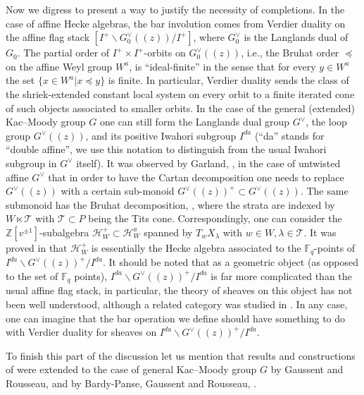 \documentclass{amsart}
\newcommand{\Z}{\mathbb{Z}}
\theoremstyle{definition}
\numberwithin{equation}{section}
\begin{document}
{  Now we digress to present a  way to justify the necessity of  completions. In the case of affine Hecke algebras, the bar involution comes from Verdier duality on the affine flag stack $[I^+\backslash G^\vee_0(\!(z)\!)/I^+]$, where $G^\vee_0$ is the Langlands dual of $G_0$. The partial order of $I^+\times I^+$-orbits on $G_0^\vee(\!(z)\!)$, i.e., the Bruhat order $\preceq$ on the affine Weyl group $W^a$, is ``ideal-finite'' in the sense that for every $y\in W^a$ the set $\{x\in W^a| x\preceq y\}$ is finite. In particular, Verdier duality sends the class of the shriek-extended constant local system on every orbit to a finite iterated cone of such objects associated to smaller orbits. In the case of the general (extended) Kac--Moody group $G$ one can still form the Langlands dual group $G^\vee$, the loop group $G^\vee(\!(z)\!)$, and its positive Iwahori subgroup $I^{da}$ (``da'' stands for ``double affine'', we use this notation to distinguish from the usual Iwahori subgroup in $G^\vee$ itself). It was observed by Garland, \cite{Garland}, in the case of untwisted affine $G^\vee$ that in order to have the Cartan decomposition one needs to replace $G^\vee(\!(z)\!)$ with a certain sub-monoid $G^\vee(\!(z)\!)^+\subset G^\vee(\!(z)\!)$. The same submonoid has the Bruhat decomposition, \cite{Braverman_Kazhdan_Patnaik}, where the strata are indexed by $W\ltimes \mathcal{T}$ with $\mathcal{T}\subset P$ being the Tits cone. Correspondingly, one can consider the $\Z[v^{\pm 1}]$-subalgebra  $\mathcal{H}_W^+\subset\mathcal{H}_W^a$ spanned by $T_w X_\lambda$ with $w\in W,\lambda\in \mathcal{T}$. It was proved in \cite{Braverman_Kazhdan_Patnaik} that $\mathcal{H}^+_W$ is essentially the Hecke algebra associated to the $\mathbb{F}_q$-points of  $I^{da}\backslash G^\vee(\!(z)\!)^+/I^{da}$. It should be noted that as a geometric object (as opposed to the set of $\mathbb{F}_q$ points),  $I^{da}\backslash G^\vee(\!(z)\!)^+/I^{da}$ is far more complicated than the usual affine flag stack, in particular, the theory of sheaves on this object has not been well understood, although a related category was studied in \cite{Bouthier_Vasserot}. In any case, one can imagine that the bar operation we define should have something to do with Verdier duality for sheaves on $I^{da}\backslash G^\vee(\!(z)\!)^+/I^{da}$.

To finish this part of the discussion let us mention that results and constructions of \cite{Braverman_Kazhdan_2011, Braverman_Kazhdan_Patnaik} were extended to the case of general Kac--Moody group $G$ by Gaussent and Rousseau, \cite{Gaussent_Rousseau} and by Bardy-Panse, Gaussent and Rousseau, \cite{BPGR}.

}
\end{document}
